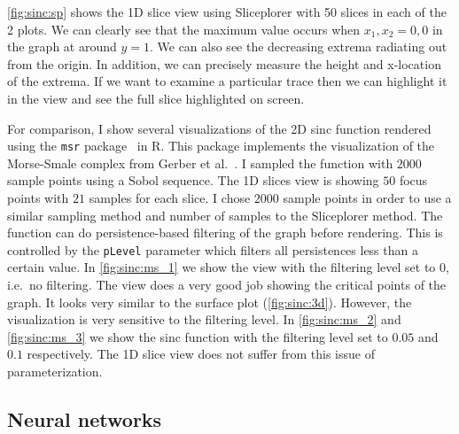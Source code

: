 \autoref{fig:sinc:sp} shows the 1D slice view using Sliceplorer with
50 slices in each of the 2 plots. We can clearly see that
the maximum value occurs when $x_1,x_2 = 0,0$ in the graph at around $y=1$.
We can also see the decreasing extrema radiating out from the origin. 
In addition, we can
precisely measure the height and x-location of the extrema. If we want
to examine a particular trace then we can highlight it in the view and see
the full slice highlighted on screen.

For comparison, I show several visualizations of the 2D sinc function rendered using
the \texttt{msr} package~\cite{Gerber:2012} in R. This package implements the
visualization of the Morse-Smale complex from Gerber et al.~\cite{Gerber:2010}.
I sampled the function with $2000$ sample points using a Sobol sequence. The
1D slices view is showing $50$ focus points with $21$ samples for each slice. 
I chose $2000$ sample points in order to use a similar sampling method and number of samples to the
Sliceplorer method. The function can do persistence-based filtering of the
graph before rendering.  This is controlled by the \texttt{pLevel} parameter
which filters all persistences less than a certain value. In
\autoref{fig:sinc:ms_1} we show the view with the filtering level set to $0$,
i.e.\ no filtering. The view does a very good job showing the critical points
of the graph. It looks very similar to the surface plot
(\autoref{fig:sinc:3d}). However, the visualization is very sensitive to the
filtering level. In \autoref{fig:sinc:ms_2} and \autoref{fig:sinc:ms_3} we show
the sinc function with the filtering level set to $0.05$ and $0.1$
respectively.  The 1D slice view does not suffer from this issue of
parameterization.

\subsection{Neural networks}\label{neural-networks}

